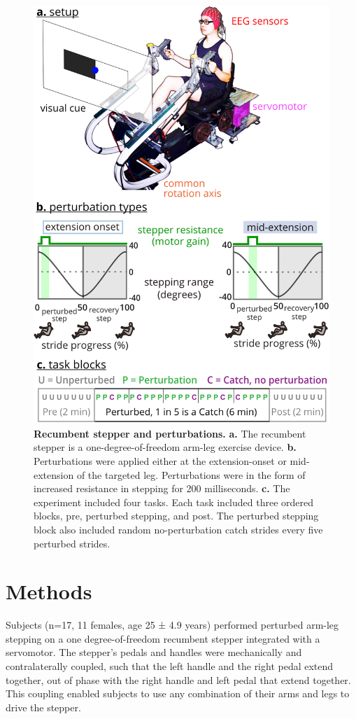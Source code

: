 \documentclass[shortpaper,twoside,web]{ieeecolor}
\begin{document}
\begin{figure}[!t]
\centerline{\includegraphics{figures/01_device-protocol_errorMetric.jpg}}
\caption{\textbf{Recumbent stepper and perturbations.} \textbf{a.} The recumbent stepper is a one-degree-of-freedom arm-leg exercise device. \textbf{b.} Perturbations were applied either at the extension-onset or mid-extension of the targeted leg. Perturbations were in the form of increased resistance in stepping for 200 milliseconds. \textbf{c.} The experiment included four tasks. Each task included three ordered blocks, pre, perturbed stepping, and post. The perturbed stepping block also included random no-perturbation catch strides every five perturbed strides.}
\label{fig1}
\end{figure}

\section{Methods}
\label{sec:methods}
Subjects (n=17, 11 females, age 25 ± 4.9 years) performed perturbed arm-leg stepping on a one degree-of-freedom recumbent stepper integrated with a servomotor. The stepper’s pedals and handles were mechanically and contralaterally coupled, such that the left handle and the right pedal extend together, out of phase with the right handle and left pedal that extend together. This coupling enabled subjects to use any combination of their arms and legs to drive the stepper.
\end{document}
